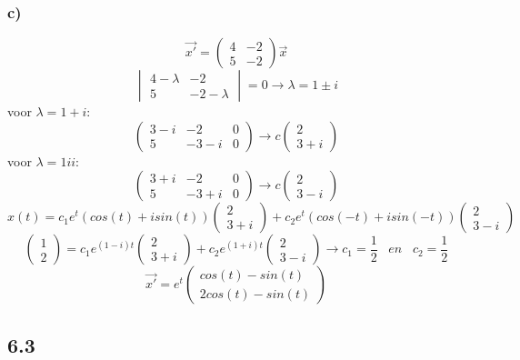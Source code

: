 \documentclass[11pt]{article}
\begin{document}
\subsubsection*{c)}
\[
\vec{x'} = \begin{pmatrix}
4 & -2\\
5 & -2
\end{pmatrix}\vec{x}
\]
\[
\begin{vmatrix}
4-\lambda & -2\\
5 & -2-\lambda
\end{vmatrix}
=0
\longrightarrow
\lambda = 1 \pm i
\]
voor $\lambda=1+i$:
\[
\left(
\begin{array}{cc|c}
3-i & -2 & 0 \\
5 & -3-i & 0
\end{array}
\right)
\longrightarrow
c
\begin{pmatrix}
2 \\ 3+i
\end{pmatrix}
\]
voor $\lambda=1ii$:
\[
\left(
\begin{array}{cc|c}
3+i & -2 & 0 \\
5 & -3+i & 0
\end{array}
\right)
\longrightarrow
c
\begin{pmatrix}
2 \\ 3-i
\end{pmatrix}
\]
\[
x(t)=
c_1e^t(cos(t)+isin(t))
\begin{pmatrix}
2 \\ 3+i
\end{pmatrix}
+
c_2e^t(cos(-t)+isin(-t))
\begin{pmatrix}
2 \\ 3-i
\end{pmatrix}
\]
\[
\begin{pmatrix}
1\\2
\end{pmatrix}
=
c_1
e^{(1-i)t}
\begin{pmatrix}
2\\3+i
\end{pmatrix}
+
c_2
e^{(1+i)t}
\begin{pmatrix}
2\\3-i
\end{pmatrix}
\longrightarrow
c_1 = \frac{1}{2}
\;\;\;en\;\;\;
c_2 = \frac{1}{2}
\]
\[
\vec{x'} = e^t\begin{pmatrix}
cos(t)-sin(t)\\2cos(t)-sin(t)
\end{pmatrix}
\]


\subsection*{6.3}
\end{document}
